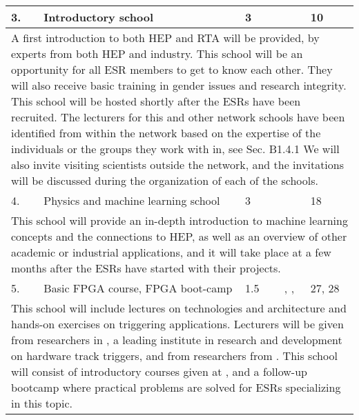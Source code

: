 \begin{center}
{\begin{tabular}{@{}lp{56mm}p{7mm}p{40mm}p{20mm}@{}}
			    
				\cellcolor{lime} 3. & Introductory school & 3 & \nikhefentity & 10  \tabularnewline\hline%
				
			    \multicolumn{5}{p{\textwidth}}{
			    
			    A first introduction to both HEP and RTA will be provided, by experts from both HEP and industry. 
			    This school will be an opportunity for all ESR members to get to know each other. 
			    They will also receive basic training in gender issues and research integrity. 
			    This school will be hosted shortly after the ESRs have been recruited. The lecturers for this and other
			    network schools have been identified from within the network based on
			    the expertise of the individuals or the groups they work with in, see Sec. B1.4.1%
			    We will also invite visiting scientists outside the network, and the invitations will be discussed during the organization of each of the schools.   
			    } \tabularnewline \hline\midrule
			    
			    
				\cellcolor{orange} 4. & Physics and machine learning school & 3 & \unigeentity & 18 \tabularnewline\hline
				
				\multicolumn{5}{p{\textwidth}}{
				
				 This school will provide an in-depth introduction to machine learning concepts and the connections to HEP,
				 as well as an overview of other academic or industrial applications, and it will take place at \unige a
				 few months after the ESRs have started with their projects. 
			    } \tabularnewline \hline\midrule
			    
			    
				\cellcolor{yellow} 5. & Basic FPGA course, FPGA boot-camp & 1.5 & \cernentity, \ohioentity, \pisaentity & 27, 28 \tabularnewline\hline
				
				\multicolumn{5}{p{\textwidth}}{				
				
				This school will include lectures on technologies and architecture and hands-on exercises on
				triggering applications. Lecturers will be given from researchers in \pisaentity, a leading
				institute in research and development on hardware track triggers, and from researchers from
				\ohioentity. This school will consist of introductory courses given at \cernentity, and a
				follow-up bootcamp where practical problems are solved for ESRs specializing in this topic. 
			    } \tabularnewline \hline\midrule	
			    

\end{tabular}}
\end{center}
